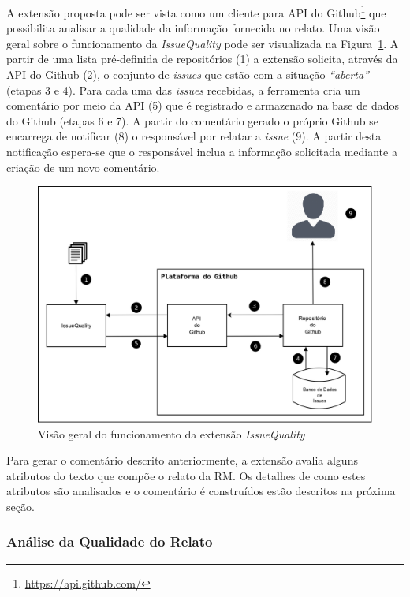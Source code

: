 A extensão proposta pode ser vista como um cliente para API do
Github\footnote{\url{https://api.github.com/}} que possibilita analisar a
qualidade da informação fornecida no relato. Uma visão geral sobre o
funcionamento da \textit{IssueQuality} pode ser visualizada na
Figura~\ref{fig:diagrama_funcionamento_issuequality}. A partir de uma lista
pré-definida de repositórios (1) a extensão solicita, através da API do Github
(2), o conjunto de \textit{issues} que estão com a situação \textit{``aberta''}
(etapas 3 e 4). Para cada uma das \textit{issues} recebidas, a ferramenta cria
um comentário por meio da API (5) que é registrado e armazenado na base de dados
do Github (etapas 6 e 7). A partir do comentário gerado o próprio Github se
encarrega de notificar (8) o responsável por relatar a \textit{issue} (9). A
partir desta notificação espera-se que o responsável inclua a informação
solicitada mediante a criação de um novo comentário.

\begin{figure}[htpb]
    \centering
    \includegraphics[width=0.7\linewidth]{chapter-implementacao-extensoes-fgrm/img/diagrama_funcionamento_issuequality.png}
    \caption{Visão geral do funcionamento da extensão \textit{IssueQuality}}
\label{fig:diagrama_funcionamento_issuequality}
\end{figure}

Para gerar o comentário descrito anteriormente, a extensão avalia alguns
atributos do texto que compõe o relato da RM\@. Os detalhes de como estes
atributos são analisados e o comentário é construídos estão descritos na próxima
seção.

\subsubsection{Análise da Qualidade do Relato}
\label{ssub:implementacao_extensao_analise_qualidade_do_relato}

